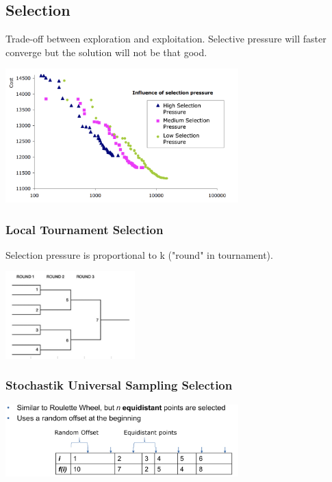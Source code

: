\documentclass[10pt,a4paper,twocolumn]{article}
\begin{document}
\subsection{Selection}
Trade-off between exploration and exploitation. Selective pressure will faster converge but the solution will not be that good.

\begin{center}
	\includegraphics[width=9cm]{images/selection-pressure}
\end{center}

\subsubsection{Local Tournament Selection}
Selection pressure is proportional to k ("round" in tournament).
\begin{center}
	\includegraphics[width=5cm]{images/tournament-selection}
\end{center}

\subsubsection{Stochastik Universal Sampling Selection}
\begin{center}
	\includegraphics[width=9cm]{images/stochastik-selection}
\end{center}
\end{document}

